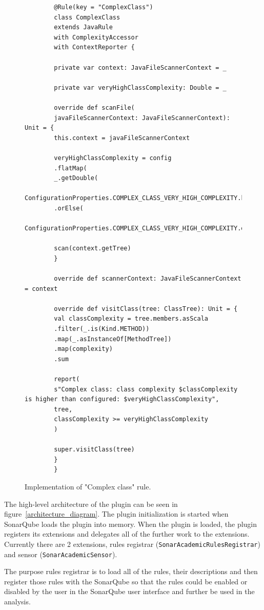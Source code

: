 \begin{figure} [htb]
    \lstset{language=Scala}
    \begin{lstlisting}
        @Rule(key = "ComplexClass")
        class ComplexClass
        extends JavaRule
        with ComplexityAccessor
        with ContextReporter {

        private var context: JavaFileScannerContext = _

        private var veryHighClassComplexity: Double = _

        override def scanFile(
        javaFileScannerContext: JavaFileScannerContext): Unit = {
        this.context = javaFileScannerContext

        veryHighClassComplexity = config
        .flatMap(
        _.getDouble(
        ConfigurationProperties.COMPLEX_CLASS_VERY_HIGH_COMPLEXITY.key))
        .orElse(
        ConfigurationProperties.COMPLEX_CLASS_VERY_HIGH_COMPLEXITY.defaultValue.toDouble)

        scan(context.getTree)
        }

        override def scannerContext: JavaFileScannerContext = context

        override def visitClass(tree: ClassTree): Unit = {
        val classComplexity = tree.members.asScala
        .filter(_.is(Kind.METHOD))
        .map(_.asInstanceOf[MethodTree])
        .map(complexity)
        .sum

        report(
        s"Complex class: class complexity $classComplexity is higher than configured: $veryHighClassComplexity",
        tree,
        classComplexity >= veryHighClassComplexity
        )

        super.visitClass(tree)
        }
        }
    \end{lstlisting}
    \caption{Implementation of "Complex class" rule.}
    \label{complex_class_implementation}
\end{figure}

\FloatBarrier

The high-level architecture of the plugin can be seen in figure~\ref{architecture_diagram}.
The plugin initialization is started when SonarQube loads the plugin into memory.
When the plugin is loaded, the plugin registers its extensions and delegates all of the
further work to the extensions.
Currently there are 2 extensions, rules registrar (\verb|SonarAcademicRulesRegistrar|) and
sensor (\verb|SonarAcademicSensor|).


The purpose rules registrar is to load all of the rules, their descriptions and then register
those rules with the SonarQube so that the rules could be enabled or disabled by the
user in the SonarQube user interface and further be used in the analysis.



